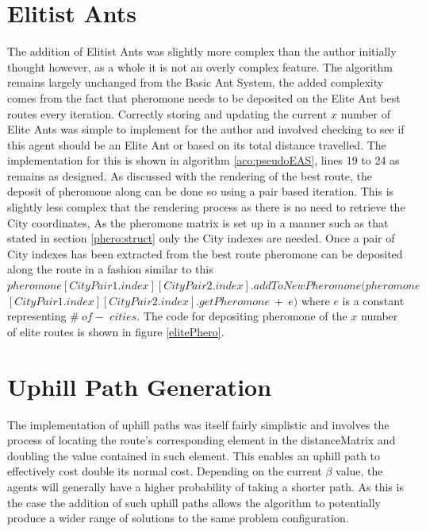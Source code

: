\section{Elitist Ants}

The addition of Elitist Ants was slightly more complex than the author initially thought however, as a whole it is not an overly complex feature. The algorithm remains largely unchanged from the Basic Ant System, the added complexity comes from the fact that pheromone needs to be deposited on the Elite Ant best routes every iteration. Correctly storing and updating the current $x$ number of Elite Ants was simple to implement for the author and involved checking to see if this agent should be an Elite Ant or based on its total distance travelled. The implementation for this is shown in algorithm \ref{aco:pseudoEAS}, lines 19 to 24 as remains as designed. As discussed with the rendering of the best route, the deposit of pheromone along can be done so using a pair based iteration. This is slightly less complex that the rendering process as there is no need to retrieve the City coordinates, As the pheromone matrix is set up in a manner such as that stated in section \ref{phero:struct} only the City indexes are needed. Once a pair of City indexes has been extracted from the best route pheromone can be deposited along the route in a fashion similar to this $pheromone[CityPair1.index][CityPair2.index].addToNewPheromone(pheromone$ \\ $[CityPair1.index][CityPair2.index].getPheromone\ +\ e )$ where $e$ is a constant representing $\# \ of-$ $cities$. The code for depositing pheromone of the $x$ number of elite routes is shown in figure \ref{elitePhero}.

\section{Uphill Path Generation}

The implementation of uphill paths was itself fairly simplistic and involves the process of locating the route's corresponding element in the distanceMatrix and doubling the value contained in such element. This enables an uphill path to effectively cost double its normal cost. Depending on the current $\beta$ value, the agents will generally have a higher probability of taking a shorter path. As this is the case the addition of such uphill paths allows the algorithm to potentially produce a wider range of solutions to the same problem configuration.

